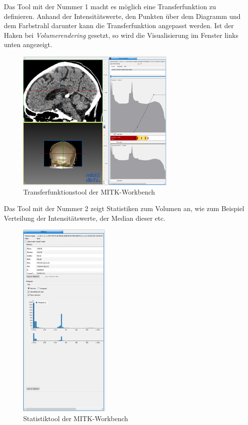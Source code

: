 Das Tool mit der Nummer 1 macht es möglich eine Transferfunktion zu definieren. Anhand der Intensitätswerte, den Punkten über dem Diagramm und dem Farbstrahl darunter kann die Transferfunktion angepasst werden. Ist der Haken bei \textit{Volumerendering} gesetzt, so wird die Visualisierung im Fenster links unten angezeigt.

\begin{figure}[H] 
\centering 
\includegraphics[width=0.7\textwidth]{Logos/MITK_Doku/3.PNG}
\caption{Transferfunktionstool der MITK-Workbench} 
\label{fig:drei} 
\end{figure}

Das Tool mit der Nummer 2 zeigt Statistiken zum Volumen an, wie zum Beispiel Verteilung der Intensitätswerte, der Median dieser etc.

\begin{figure}[H] 
\centering 
\includegraphics[width=0.4\textwidth]{Logos/MITK_Doku/4.PNG}
\caption{Statistiktool der MITK-Workbench} 
\label{fig:vier} 
\end{figure}

